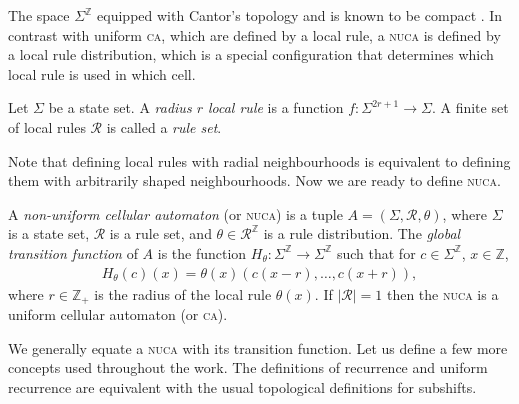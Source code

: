 \documentclass[runningheads]{llncs}
\newcommand{\Z}{\mathbb{Z}}
\newcommand{\R}{\mathcal{R}}
\newcommand{\set}[2]{\{ #1 \: | \: #2 \}}
\begin{document}

The space $\Sigma^\Z$ equipped with Cantor's topology and is known to be compact \cite{cecc}. In contrast with uniform \textsc{ca}, which are defined by a local rule, a \textsc{nuca} is defined by a local rule distribution, which is a special configuration that determines which local rule is used in which cell.

\begin{definition}
Let $\Sigma$ be a state set. A \emph{radius $r$ local rule} is a function $f:\Sigma^{2r+1} \rightarrow \Sigma$. A finite set of local rules $\mathcal{\R}$ is called a \emph{rule set}.
\end{definition}

Note that defining local rules with radial neighbourhoods is equivalent to defining them with arbitrarily shaped neighbourhoods. Now we are ready to define \textsc{nuca}.

\begin{definition}
A \emph{non-uniform cellular automaton} (or \textsc{nuca}) is a tuple $A = (\Sigma, \R,\theta)$, where $\Sigma$ is a state set, $\R$ is a rule set, and $\theta \in \R^\Z$ is a rule distribution. The \emph{global transition function} of $A$ is the function $H_\theta:\Sigma^\Z \rightarrow \Sigma^\Z$ such that for $c\in \Sigma^\Z$, $x \in \Z$, 
\begin{align*}
H_\theta (c)(x) = \theta(x) (c(x-r),\ldots,c(x+r)),
\end{align*}
where $r \in \Z_+$ is the radius of the local rule $\theta (x)$. If $|\R| = 1$ then the \textsc{nuca} is a uniform cellular automaton (or \textsc{ca}).
\end{definition}

We generally equate a \textsc{nuca} with its transition function. Let us define a few more concepts used throughout the work. The definitions of recurrence and uniform recurrence are equivalent with the usual topological definitions for subshifts.
\end{document}
